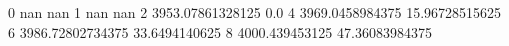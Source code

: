 0 nan nan
1 nan nan
2 3953.07861328125 0.0
4 3969.0458984375 15.96728515625
6 3986.72802734375 33.6494140625
8 4000.439453125 47.36083984375
